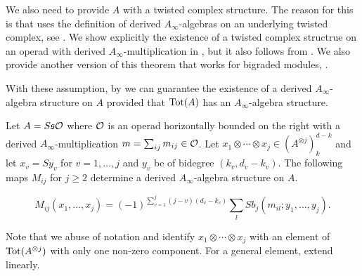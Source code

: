 \documentclass[Thesis.tex]{subfiles}
\begin{document}
We also need to provide $A$ with a twisted complex structure. The reason for this is that  uses the definition of derived $A_\infty$-algebras on an underlying twisted complex, see . We show explicitly the existence of a twisted complex structrue on an operad with derived $A_\infty$-multiplication in , but it also follows from . We also provide another version of this theorem that works for bigraded modules, . 

With these assumption, by  we can guarantee the existence of a derived $A_\infty$-algebra structure on $A$ provided that $\operatorname{Tot}(A)$ has an $A_\infty$-algebra structure.




\begin{thm}\label{derivedmaps}
Let $A=S\mathfrak{s}{\mathcal O}$ where ${\mathcal O}$ is an operad horizontally bounded on the right with a derived $A_\infty$-multiplication $m=\sum_{ij}m_{ij}\in{\mathcal O}$. Let $x_1\otimes\cdots\otimes x_j\in (A^{\otimes j})^{d-k}_k$ and let $x_v = Sy_v$ for $v=1,\dots, j$ and $y_v$ be of bidegree $(k_v,d_v-k_v)$. The following maps $M_{ij}$ for $j\geq 2$ determine a derived $A_\infty$-algebra structure on $A$.


\[M_{ij}(x_1,\dots,x_j)= (-1)^{\sum_{v=1}^j(j-v)(d_v-k_v)}\sum_lSb_j(m_{il};y_1,\dots, y_j). \]
\end{thm}
Note that we abuse of notation and identify $x_1\otimes\cdots\otimes x_j$ with an element of $\operatorname{Tot}(A^{\otimes j})$ with only one non-zero component. For a general element, extend linearly.
\end{document}
